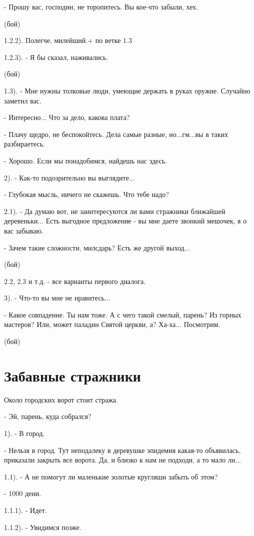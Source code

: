 \documentclass[12pt,a4paper]{book}
\begin{document}
- Прошу вас, господин, не торопитесь. Вы кое-что забыли, хех.

(бой)

1.2.2). Полегче, милейший.+ по ветке 1.3

1.2.3). - Я бы сказал, наживались.

(бой)

1.3). - Мне нужны толковые люди, умеющие держать в руках оружие. Случайно заметил вас.

- Интересно... Что за дело, какова плата?

- Плачу щедро, не беспокойтесь. Дела самые разные, но...гм...вы в таких разбираетесь.

- Хорошо. Если мы понадобимся, найдешь нас здесь.

2). - Как-то подозрительно вы выглядите...

- Глубокая мысль, ничего не скажешь. Что тебе надо?

2.1). - Да думаю вот, не заинтересуются ли вами стражники ближайшей деревеньки... Есть выгодное предложение - вы мне даете звонкий мешочек, я о вас забываю.

- Зачем такие сложности, милсдарь? Есть же другой выход... 

(бой)

2.2, 2.3 и т.д. - все варианты первого диалога.

3). - Что-то вы мне не нравитесь...

- Какое совпадение. Ты нам тоже. А с чего такой смелый, парень? Из горных мастеров? Или, может паладин Святой церкви, а? Ха-ха... Посмотрим.

(бой)

\section{Забавные стражники}

Около городских ворот стоит стража.

- Эй, парень, куда собрался?

1). - В город.

- Нельзя в город. Тут неподалеку в деревушке эпидемия какая-то объявилась, приказали закрыть все ворота. Да, и близко к нам не подходи, а то мало ли...

1.1). - А не помогут ли маленькие золотые кругляши забыть об этом?

- 1000 дени.

1.1.1). - Идет.

1.1.2). - Увидимся позже.
\end{document}
